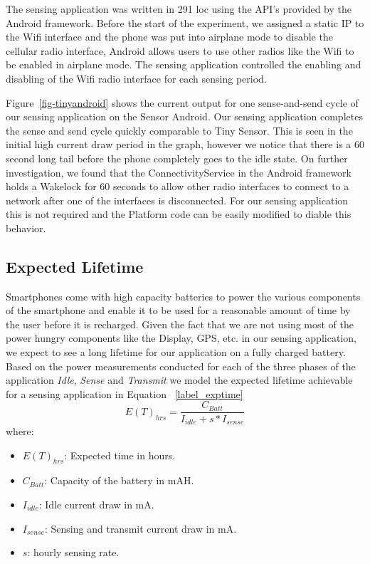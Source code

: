 The sensing application was written in 291 loc using the API's provided by the Android framework. 
Before the start of the experiment, we assigned a static IP to the Wifi interface and the phone was put into airplane mode to 
disable the cellular radio interface, Android allows users to use other radios like the Wifi to be enabled in airplane mode.
The sensing application controlled the enabling and disabling of the Wifi radio interface for each sensing period.

Figure~\ref{fig-tinyandroid} shows the current output for one sense-and-send cycle of our 
sensing application on the Sensor Android. Our sensing application completes the sense and 
send cycle quickly comparable to Tiny Sensor. This is seen in the initial high current draw period 
in the graph, however we notice that there is a 60 second long tail before
the phone completely goes to the idle state. On further investigation, we found that the 
ConnectivityService in the Android framework holds a Wakelock for 60 seconds to allow other 
radio interfaces to connect  to a network after one of the interfaces is disconnected. 
For our sensing application this is not required and the Platform code can be easily modified to diable this behavior.

\subsection{Expected Lifetime}
Smartphones come with high capacity batteries to power the various components of the smartphone and enable it to be used for a reasonable amount of time by the user before it is recharged. Given the fact that we are not using most of the power hungry components like the Display, GPS, etc. in our sensing application, we expect to see a long lifetime for our application on a fully charged battery. Based on the power measurements conducted for each of the three phases of the application \textit{Idle}, \textit{Sense} and \textit{Transmit} we model the expected lifetime achievable for a sensing application in Equation ~\ref{label_exptime} 
\begin{equation}\label{label_exptime}
    E(T)_{hrs} = \frac{C_{Batt}}{I_{idle} + s*I_{sense}}
\end{equation}
where:
{\small
\begin{itemize}[label=]
    \item $E(T)_{hrs}$: Expected time in hours.
    \item $C_{Batt}$: Capacity of the battery in mAH.
    \item $I_{idle}$: Idle current draw in mA.
    \item $I_{sense}$: Sensing and transmit current draw in mA.
    \item $s$: hourly sensing rate.
\end{itemize}
}


